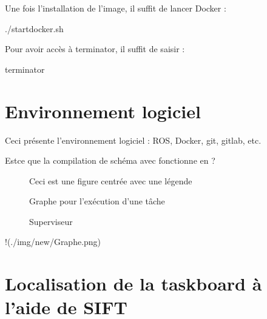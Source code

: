 \documentclass[letterpaper,10pt,english]{sphinxmanual}
\begin{document}
\sphinxAtStartPar
Une fois l’installation de l’image, il suffit de lancer Docker :

\begin{sphinxVerbatim}[commandchars=\\\{\}]
\PYGZdl{}./start\PYGZus{}docker.sh
\end{sphinxVerbatim}

\sphinxAtStartPar
Pour avoir accès à terminator, il suffit de saisir :

\begin{sphinxVerbatim}[commandchars=\\\{\}]
\PYGZdl{}terminator
\end{sphinxVerbatim}

\sphinxstepscope


\chapter{Environnement logiciel}
\label{\detokenize{environnement:environnement-logiciel}}\label{\detokenize{environnement::doc}}
\sphinxAtStartPar
Ceci présente l’environnement logiciel : ROS, Docker, git, gitlab, etc.

\sphinxAtStartPar
Est\sphinxhyphen{}ce que la compilation de schéma avec  fonctionne en  ?

\begin{figure}[htbp]
\centering
\capstart
\caption{Ceci est une figure centrée avec une légende}\label{\detokenize{environnement:id1}}\end{figure}

\begin{figure}[htbp]
\centering
\capstart
\caption{Graphe pour l’exécution d’une tâche}\label{\detokenize{environnement:id2}}\end{figure}

\begin{figure}[htbp]
\centering
\capstart
\caption{Superviseur}\label{\detokenize{environnement:id3}}\end{figure}

\sphinxAtStartPar
!(./img/new/Graphe.png)







\sphinxstepscope


\chapter{Localisation de la task\sphinxhyphen{}board à l’aide de SIFT}
\label{\detokenize{SIFT:localisation-de-la-task-board-a-l-aide-de-sift}}\label{\detokenize{SIFT::doc}}
\end{document}
